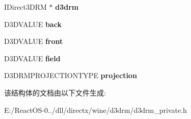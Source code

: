 \begin{DoxyCompactItemize}
I\+Direct3\+D\+RM $\ast$ {\bfseries d3drm}
\item 
\mbox{\label{structd3drm__viewport_aeca5d06bd3b7a5d9b44ba7063c12bb40}} 
D3\+D\+V\+A\+L\+UE {\bfseries back}
\item 
\mbox{\label{structd3drm__viewport_ae021a377de1aa8c33440fe29cbc0ea1b}} 
D3\+D\+V\+A\+L\+UE {\bfseries front}
\item 
\mbox{\label{structd3drm__viewport_ad6fcf36269892da2e7230f2143a35715}} 
D3\+D\+V\+A\+L\+UE {\bfseries field}
\item 
\mbox{\label{structd3drm__viewport_ad4247df79ddb5b364292509d84780e81}} 
D3\+D\+R\+M\+P\+R\+O\+J\+E\+C\+T\+I\+O\+N\+T\+Y\+PE {\bfseries projection}
\end{DoxyCompactItemize}


该结构体的文档由以下文件生成\+:\begin{DoxyCompactItemize}
\item 
E\+:/\+React\+O\+S-\/0../dll/directx/wine/d3drm/d3drm\+\_\+private.\+h\end{DoxyCompactItemize}
